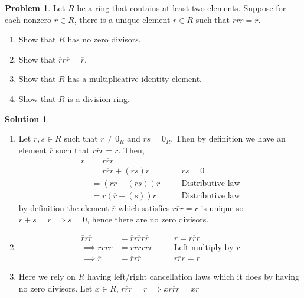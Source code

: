 \documentclass[10pt]{article}
\theoremstyle{definition}
\newtheorem{problem}{Problem}
\newtheorem{soln}{Solution}
\newcommand{\justif}[2]{&{#1}&\text{#2}}
\begin{document}
\begin{problem}
Let $R$ be a ring that contains at least two elements. Suppose for each
nonzero $r\in R$, there is a unique element $\overline{r}\in R$  such that $r\overline{r}r=r$.
\begin{enumerate}[label=(\alph*)]
  \item Show that $R$ has no zero divisors.
  \item Show that $\overline{r}r\overline{r}=\overline{r}$.
  \item Show that $R$ has a multiplicative identity element.
  \item Show that $R$ is a division ring.
\end{enumerate}
\end{problem}
\begin{soln}
  \begin{enumerate}[label=(\alph*)]
    \item Let $r,s \in R$ such that $r\neq 0_R$ and $rs=0_R$. Then by definition we have an element $\overline{r}$ such that
          $r\overline{r}r=r$. Then,
          \begin{align*}
            r & = r\overline{r}r                                           \\
              & = r\overline{r}r + (rs)r \justif{\quad}{$rs=0$}            \\
              & = (r\overline{r} + (rs))r \justif{\quad}{Distributive law} \\
              & = r(\overline{r} + (s))r \justif{\quad}{Distributive law}
          \end{align*}
          by definition the element $\overline{r}$ which satisfies $r\overline{r}r=r$ is unique so $\overline{r}+s=\overline{r}\implies s=0$, hence
          there are no zero divisors.
    \item \begin{align*}
            \overline{r}r\overline{r}           & =\overline{r}r\overline{r}r\overline{r} \justif{\quad}{$r=r\overline{r}r$}   \\
            \implies r\overline{r}r\overline{r} & =r\overline{r}r\overline{r}r\overline{r}\justif{\quad}{Left multiply by $r$} \\
            \implies \overline{r}               & =\overline{r}r\overline{r}\justif{\quad}{$r\overline{r}r=r$}
          \end{align*}
    \item Here we rely on $R$ having left/right cancellation laws which it does by having no zero divisors. Let $x\in R$, $r\overline{r}r=r\implies xr\overline{r}r=xr$

\end{enumerate}
\end{soln}
\end{document}
